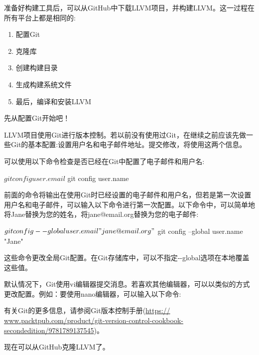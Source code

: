 
准备好构建工具后，可以从GitHub中下载LLVM项目，并构建LLVM。这一过程在所有平台上都是相同的:

\begin{enumerate}
\item
配置Git

\item
克隆库

\item
创建构建目录

\item
生成构建系统文件

\item
最后，编译和安装LLVM
\end{enumerate}

先从配置Git开始吧！


LLVM项目使用Git进行版本控制。若以前没有使用过Git，在继续之前应该先做一些Git的基本配置:设置用户名和电子邮件地址。提交修改，将使用这两个信息。

可以使用以下命令检查是否已经在Git中配置了电子邮件和用户名:

\begin{shell}
$ git config user.email
$ git config user.name
\end{shell}

前面的命令将输出在使用Git时已经设置的电子邮件和用户名，但若是第一次设置用户名和电子邮件，可以输入以下命令进行第一次配置。以下命令中，可以简单地将Jane替换为您的姓名，将jane@email.org替换为您的电子邮件:

\begin{shell}
$ git config --global user.email "jane@email.org"
$ git config --global user.name "Jane"
\end{shell}

这些命令更改全局Git配置。在Git存储库中，可以不指定-{}-global选项在本地覆盖这些值。

默认情况下，Git使用vi编辑器提交消息。若喜欢其他编辑器，可以以类似的方式更改配置。例如：要使用nano编辑器，可以输入以下命令:


有关Git的更多信息，请参阅Git版本控制手册(\url{https:// www.packtpub.com/product/git-version-control-cookbook-secondedition/9781789137545})。

现在可以从GitHub克隆LLVM了。


